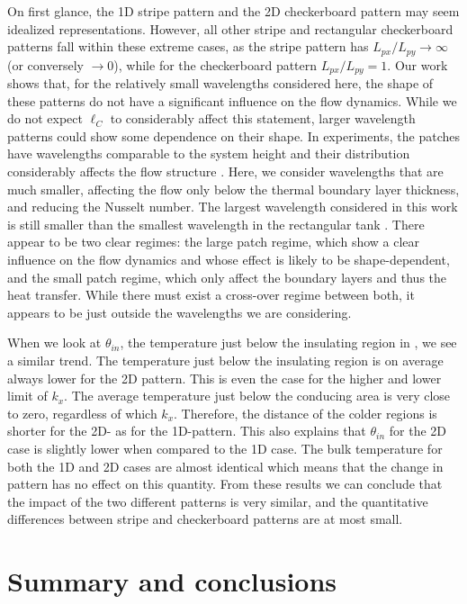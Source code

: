 On first glance, the 1D stripe pattern and the 2D checkerboard pattern may
seem idealized representations. However, all other stripe and rectangular
checkerboard patterns fall within these extreme cases, as the stripe pattern
has $L_{px}/L_{py} \to \infty$ (or conversely $\to 0$), while for the
checkerboard pattern $L_{px}/L_{py}=1$.  Our work shows that, for the
relatively small wavelengths considered here, the shape of these patterns do
not have a significant influence on the flow dynamics. While we do not expect
$\ell_C$ to considerably affect this statement, larger wavelength patterns
could show some dependence on their shape. In experiments,
the patches have wavelengths comparable to the system height
and their distribution considerably affects the flow structure \citep{Wang2017}. Here, we
consider wavelengths that are much smaller, affecting the flow only below the
thermal boundary layer thickness, and reducing the Nusselt number.  The
largest wavelength considered in this work is still smaller than the smallest
wavelength in the rectangular tank \citep{Wang2017}. There appear to be two
clear regimes: the large patch regime, which show a clear influence on the
flow dynamics and whose effect is likely to be shape-dependent, and the small
patch regime, which only affect the boundary layers and thus the heat
transfer. While there must exist a cross-over regime between both, it appears
to be just outside the wavelengths we are considering. 

When we look at $\theta_{in}$, the temperature just below the insulating
region in , we see a similar trend.  The temperature
just below the insulating region is on average always lower for the 2D pattern.
This is even the case for the higher and lower limit of $k_x$.  The average
temperature just below the conducing area is very close to zero, regardless of
which $k_x$.  Therefore, the distance of the colder regions is shorter for the
2D- as for the 1D-pattern.  This also explains that $\theta_{in}$ for the 2D
case is slightly lower when compared to the 1D case.  The bulk temperature for
both the 1D and 2D cases are almost identical which means that the change in
pattern has no effect on this quantity.  From these results we can conclude
that the impact of the two different patterns is very similar, and the
quantitative differences between stripe and checkerboard patterns are at most
small.

\section{Summary and conclusions}\label{Conclusion}

